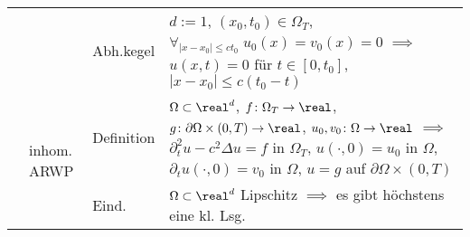 \begin{landscape}
\begin{tabular}{p{20mm}p{20mm}p{30mm}p{169mm}}
        &&Abh.kegel&
        $d := 1$, $(x_0, t_0) \in \Omega_T$,
        $\forall_{|x - x_0| \le ct_0}\; u_0(x) = v_0(x) = 0$
        $\implies$ $u(x,t) = 0$ für $t \in [0, t_0]$, $|x - x_0| \le c(t_0 - t)$\\

        \cmidrule{2-4}

        &\multirow{3}{20mm}{inhom. ARWP}&
        Definition&
        $\Omega \subset \real^d$,
        $f\colon \Omega_T \to \real$,
        $g\colon \partial\Omega \times (0, T) \to \real$,
        $u_0, v_0\colon \Omega \to \real$\newline
        $\implies$
        $\partial_t^2 u - c^2 \Delta u = f$ in $\Omega_T$,
        $u(\cdot, 0) = u_0$ in $\Omega$,
        $\partial_t u(\cdot, 0) = v_0$ in $\Omega$,
        $u = g$ auf $\partial\Omega \times (0, T)$\\

        &&Eind.&
        $\Omega \subset \real^d$ Lipschitz
        $\implies$ es gibt höchstens eine kl. Lsg.\\

        \bottomrule
    \end{tabular}

    \pagebreak
\end{landscape}

\pagebreak
